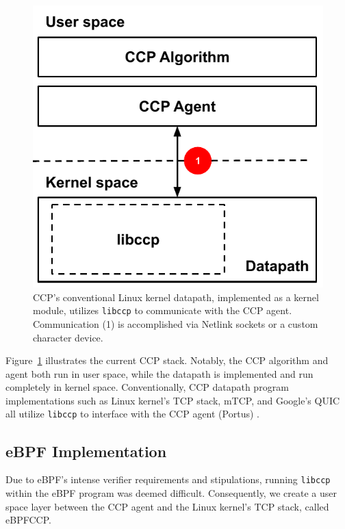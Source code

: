 \documentclass[../main.tex]{subfiles}
\begin{document}
\begin{figure}[t]
\centering
    \includegraphics[width=\columnwidth]{img/ccp-traditional}
    \caption{CCP's conventional Linux kernel datapath, implemented as a kernel module, utilizes \texttt{libccp} to communicate with the CCP agent.
        Communication (1) is accomplished via Netlink sockets or a custom character device.
    }\label{fig:ccptraditional}
\end{figure}

Figure~\ref{fig:ccptraditional} illustrates the current CCP stack.
Notably, the CCP algorithm and agent both run in user space, while the datapath is implemented and run completely in kernel space.
Conventionally, CCP datapath program implementations such as Linux kernel's TCP stack, mTCP, and Google's QUIC all utilize \texttt{libccp} to interface with the CCP agent (Portus) \cite{ccp}.

\subsection{eBPF Implementation}

Due to eBPF's intense verifier requirements and stipulations, running \texttt{libccp} within the eBPF program was deemed difficult.
Consequently, we create a user space layer between the CCP agent and the Linux kernel's TCP stack, called eBPFCCP.
\end{document}
